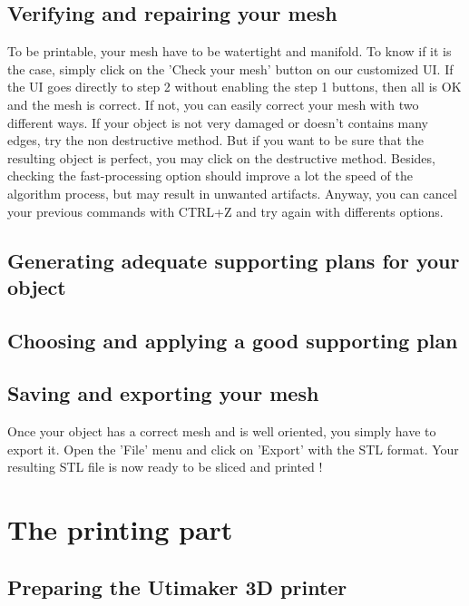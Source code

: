 \documentclass{article}
\begin{document}
\subsection{Verifying and repairing your mesh}

To be printable, your mesh have to be watertight and manifold. To know if it is the case, simply click on the 'Check your mesh' button on our customized UI. If the UI goes directly to step 2 without enabling the step 1 buttons, then all is OK and the mesh is correct. If not, you can easily correct your mesh with two different ways. If your object is not very damaged or doesn't contains many edges, try the non destructive method. But if you want to be sure that the resulting object is perfect, you may click on the destructive method. Besides, checking the fast-processing option should improve a lot the speed of the algorithm process, but may result in unwanted artifacts. Anyway, you can cancel your previous commands with CTRL+Z and try again with differents options.

\subsection{Generating adequate supporting plans for your object}

\subsection{Choosing and applying a good supporting plan}

\subsection{Saving and exporting your mesh}

Once your object has a correct mesh and is well oriented, you simply have to export it. Open the 'File' menu and click on 'Export' with the STL format. Your resulting STL file is now ready to be sliced and printed !

\newpage

\section{The printing part}

\subsection{Preparing the Utimaker 3D printer}
\end{document}

